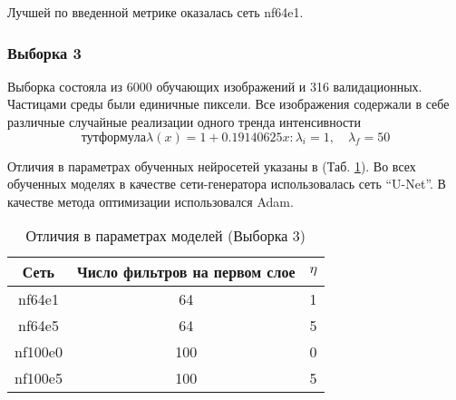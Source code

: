 			Лучшей по введенной метрике оказалась сеть nf64e1.
		\subsubsection{Выборка 3}
			Выборка состояла из 6000 обучающих изображений и 316 валидационных. Частицами среды были единичные пиксели. Все изображения содержали в себе различные случайные реализации одного тренда интенсивности
			$$тут формула \lambda(x) = 1 + 0.19140625x: \lambda_i = 1, \quad \lambda_f = 50$$
			
			Отличия в параметрах обученных нейросетей указаны в (Таб. \ref{8-dust-trend1-nns}). Во всех обученных моделях в качестве сети-генератора использовалась сеть ``U-Net''. В качестве метода оптимизации использовался Adam.
			
			\begin{table}[h!]
				\begin{center}
					\begin{tabular}{|c|c|c|}
						\hline
						Сеть & Число фильтров на первом слое & $\eta$ \\
						\hline
						nf64e1 & 64 & 1 \\
						\hline
						nf64e5 & 64 & 5 \\
						\hline
						nf100e0 & 100 & 0 \\
						\hline
						nf100e5 & 100 & 5 \\
						\hline
					\end{tabular}
					\caption{Отличия в параметрах моделей (Выборка 3)}
					\label{8-dust-trend1-nns}
				\end{center}
			\end{table}
			
